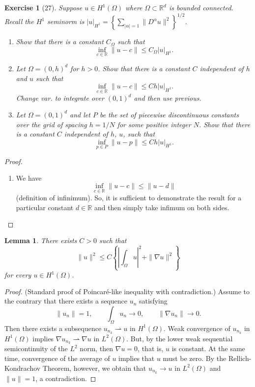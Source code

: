 \documentclass[letterpaper,twoside,11pt]{article}
\theoremstyle{mystyle}
\newtheorem{lemma}[theorem]{Lemma}
\newtheorem*{exercise}{Exercise}
\newcommand{\R}{{\mathbb R}}
\newcommand{\cbk}{\color{black}}
\newcommand{\cred}{\color{red}}
\newcommand{\cblu}{\color{blue}}
\newcommand{\Hone}{H^1\left( \Omega \right)}
\newcommand{\Ltwo}{L^2 \left( \Omega \right)}
\begin{document}
\newpage 
\begin{exercise}[27]
  Suppose $u \in H^1\left( \Omega \right)$ where $\Omega\subset \R^d$ is bounded connected. Recall the $H^1$ seminorm is $|u|_{H^1} = \left\{ \sum_{|\alpha| = 1} \|D^\alpha u \|^2 \right\}^{1/2}$. 
  \begin{enumerate}
    \item Show that there is a constant $C_\Omega$ such that 
    \[\inf_{c\in \R} \|u-c\| \leq C_\Omega |u|_{H^1}.\]
    \item Let $\Omega = \left( 0, h \right)^d$ for $h > 0$. Show that there is a constant $C$ independent of $h$ and $u$ such that 
    \[\inf_{c\in \R} \|u-c\| \leq Ch |u|_{H^1}.\]
    Change var. to integrate over $(0,1)^d$ and then use previous. 
    \item Let $\Omega = \left( 0,1 \right)^d$ and let $P$ be the set of piecewise discontinuous constants over the grid of spacing $h = 1/N$ for some positive integer $N$. Show that there is a constant $C$ independent of $h$, $u$, such that 
    \[\inf_{p\in P} \|u-p\| \leq Ch |u|_{H^1}.\]
  \end{enumerate}
\end{exercise}

\cblu 
\begin{proof}
  \begin{enumerate}
    \item We have 
    \[\inf_{c\in \R} \|u-c\| \leq \| u - d \|\]
    (definition of infinimum). So, it is sufficient to demonstrate the result for a particular constant $d\in \R$ and then simply take infimum on both sides. 


  \end{enumerate}
\end{proof}
\cbk 


\cred 
\begin{lemma}
  There exists $C> 0$ such that 
  \[\|u\|^2 \leq C \left\{ \left|\int_\Omega u \right|^2 + \|\nabla u \|^2 \right\}\]
  for every $u \in \Hone$.
\end{lemma}
\begin{proof}
  (Standard proof of Poincar\'e-like inequality with contradiction.) Assume to the contrary that there exists a sequence $u_n$ satisfying 
  \[\|u_n\| = 1, \qquad \int_\Omega u_n \to 0, \qquad \|\nabla u_n\| \to 0.\]
  Then there exists a subsequence $u_{n_k} \rightharpoonup u$ in $\Hone$. Weak convergence of $u_{n_k}$ in $\Hone$ implies $\nabla u_{n_k} \rightharpoonup \nabla u$ in $\Ltwo$. But, by the lower weak sequential semicontinuity of the $L^2$ norm, then $\nabla u = 0$, that is, $u$ is constant. At the same time, convergence of the average of $u$ implies that $u$ must be zero. By the Rellich-Kondrachov Theorem, however, we obtain that $u_{n_k} \to u$ in $\Ltwo$ and $\|u\| = 1$, a contradiction. 
\end{proof}
\cbk 
\end{document}
